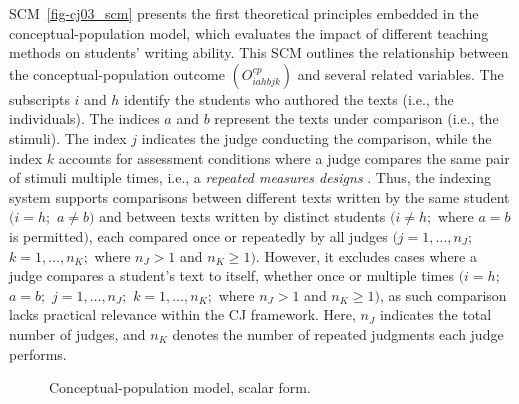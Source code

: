 \documentclass[
  authoryear,
  review,
  1p]{elsarticle}
\begin{document}
SCM~\ref{fig-cj03_scm} presents the first theoretical principles
embedded in the conceptual-population model, which evaluates the impact
of different teaching methods on students' writing ability. This SCM
outlines the relationship between the conceptual-population outcome
\((O^{cp}_{iahbjk})\) and several related variables. The subscripts
\(i\) and \(h\) identify the students who authored the texts (i.e., the
individuals). The indices \(a\) and \(b\) represent the texts under
comparison (i.e., the stimuli). The index \(j\) indicates the judge
conducting the comparison, while the index \(k\) accounts for assessment
conditions where a judge compares the same pair of stimuli multiple
times, i.e., a \emph{repeated measures designs}
\citep[pp.~366-376]{Lawson_2015}. Thus, the indexing system supports
comparisons between different texts written by the same student
\((i = h;\) \(a \neq b)\) and between texts written by distinct students
\((i \neq h;\) where \(a = b\) is permitted\()\), each compared once or
repeatedly by all judges \((j = 1,\dots,n_{J};\) \(k = 1,\dots,n_K;\)
where \(n_{J}>1\) and \(n_{K}\geq1)\). However, it excludes cases where
a judge compares a student's text to itself, whether once or multiple
times \((i = h;\) \(a = b;\) \(j = 1,\dots,n_{J};\)
\(k = 1,\dots,n_{K};\) where \(n_{J}>1\) and \(n_{K}\geq1)\), as such
comparison lacks practical relevance within the CJ framework. Here,
\(n_{J}\) indicates the total number of judges, and \(n_{K}\) denotes
the number of repeated judgments each judge performs.

\begin{figure}[H]

\begin{minipage}{\linewidth}

\centering{

\[
\begin{aligned}
  O^{cp}_{iahbjk} & := f_{O}(D_{iahbjk}) \\
  D_{iahbjk} & := f_{D}(T_{ia}, T_{hb}, B_{jk})
\end{aligned}
\]

}


\end{minipage}%
\newline
\begin{minipage}{\linewidth}



\end{minipage}%

\caption{\label{fig-cj03}Conceptual-population model, scalar form.}

\end{figure}%
\end{document}

